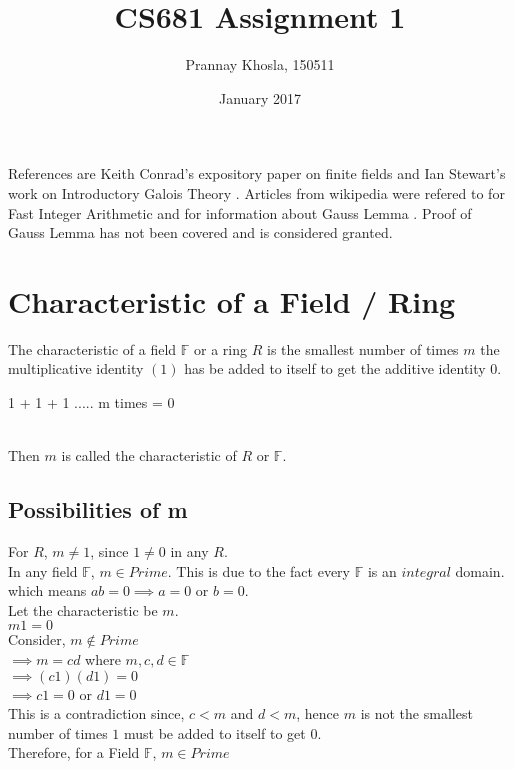 \documentclass{article}
\title{CS681 Assignment 1}
\author{Prannay Khosla, 150511}
\date{January 2017}
\begin{document}
\maketitle
References are Keith Conrad's expository paper on finite fields \cite{conrad} and Ian Stewart's work on Introductory Galois Theory \cite{stewart}. Articles from wikipedia were refered to for Fast Integer Arithmetic \cite{arithmetic} and for information about Gauss Lemma \cite{gauss}. Proof of Gauss Lemma has not been covered and is considered granted.
\section{Characteristic of a Field / Ring}
The characteristic of a field $\mathbb{F}$ or a ring $R$ is the smallest number of times $m$ the multiplicative identity $(1)$ has be added to itself to get the additive identity 0.
\begin{center}
    1 + 1 + 1 ..... m times = 0
\end{center}
\\
Then $m$ is called the characteristic of $R$ or $\mathbb{F}$.
\subsection{Possibilities of m}
For $R$, $m \neq 1$, since $1 \neq 0$ in any $R$.
\\ In any field $\mathbb{F}$, $m \in Prime$. This is due to the fact every $\mathbb{F}$ is an $integral$ domain. 
\\ which means $ ab = 0 \implies a = 0$ or $b = 0$.
\\ Let the characteristic be $m$.
\\ $m1 = 0$
\\ Consider, $ m \not \in Prime$
\\ $\implies m = cd$ where $m,c,d \in \mathbb{F}$
\\ $\implies (c1)(d1) = 0$
\\ $\implies c1 = 0$ or $d1 = 0$
\\ This is a contradiction since, $c<m$ and $d<m$, hence $m$ is not the smallest number of times $1$ must be added to itself to get $0$.
\\ Therefore, for a Field $\mathbb{F}$, $m \in Prime$
\end{document}
